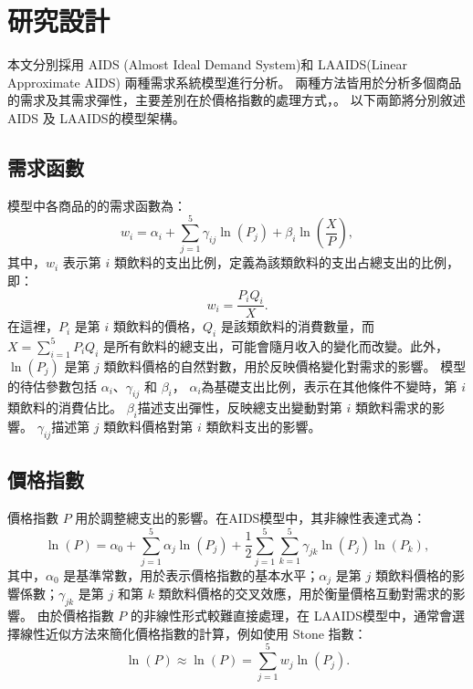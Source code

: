 \section{研究設計}

本文分別採用 AIDS (Almost Ideal Demand System)和 LAAIDS(Linear Approximate AIDS) 兩種需求系統模型進行分析。
兩種方法皆用於分析多個商品的需求及其需求彈性，主要差別在於價格指數的處理方式，。
以下兩節將分別敘述 AIDS 及 LAAIDS的模型架構。

\subsection*{需求函數}
 模型中各商品的的需求函數為：
\begin{equation}
w_i = \alpha_i + \sum_{j=1}^{5} \gamma_{ij} \ln(P_j) + \beta_i \ln\left(\frac{X}{P}\right),
\end{equation}
其中，\(w_i\) 表示第 \(i\) 類飲料的支出比例，定義為該類飲料的支出占總支出的比例，即：
\begin{equation}
w_i = \frac{P_i Q_i}{X}.
\end{equation}
在這裡，\(P_i\) 是第 \(i\) 類飲料的價格，\(Q_i\) 是該類飲料的消費數量，而 \(X = \sum_{i=1}^5 P_i Q_i\) 是所有飲料的總支出，可能會隨月收入的變化而改變。此外，\(\ln(P_j)\) 是第 \(j\) 類飲料價格的自然對數，用於反映價格變化對需求的影響。
模型的待估參數包括 \(\alpha_i\)、\(\gamma_{ij}\) 和 \(\beta_i\)，
\(\alpha_i\)為基礎支出比例，表示在其他條件不變時，第 \(i\) 類飲料的消費佔比。
\(\beta_i\)描述支出彈性，反映總支出變動對第 \(i\) 類飲料需求的影響。
\(\gamma_{ij}\)描述第 \(j\) 類飲料價格對第 \(i\) 類飲料支出的影響。


\subsection*{價格指數}
價格指數 \(P\) 用於調整總支出的影響。在AIDS模型中，其非線性表達式為：
\begin{equation}
\ln(P) = \alpha_0 + \sum_{j=1}^{5} \alpha_j \ln(P_j) + \frac{1}{2} \sum_{j=1}^{5} \sum_{k=1}^{5} \gamma_{jk} \ln(P_j) \ln(P_k),
\end{equation}
其中，\(\alpha_0\) 是基準常數，用於表示價格指數的基本水平；\(\alpha_j\) 是第 \(j\) 類飲料價格的影響係數；\(\gamma_{jk}\) 是第 \(j\) 和第 \(k\) 類飲料價格的交叉效應，用於衡量價格互動對需求的影響。
由於價格指數 \(P\) 的非線性形式較難直接處理，在 LAAIDS模型中，通常會選擇線性近似方法來簡化價格指數的計算，例如使用 Stone 指數：
\begin{equation}
	\ln(P) \approx \ln(P) = \sum_{j=1}^{5} w_j \ln(P_j).
\end{equation}

